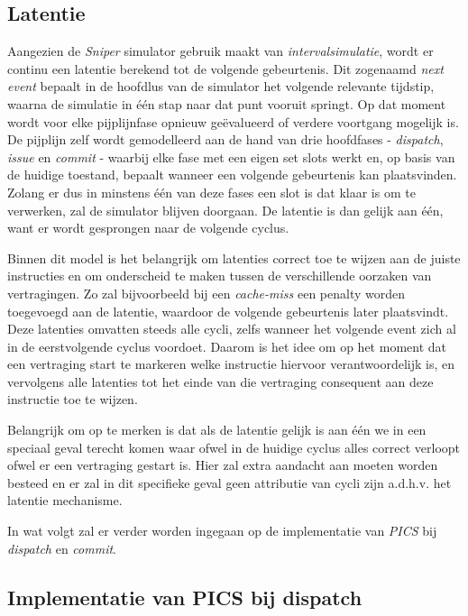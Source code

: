 \documentclass[12pt,a4paper,faculty=ea,language=nl]{ugent-doc}
\begin{document}
\subsection{Latentie}
\label{subsec:Latentie}
Aangezien de \textit{Sniper} simulator gebruik maakt van \textit{intervalsimulatie}, wordt er continu een latentie berekend tot de volgende gebeurtenis. Dit zogenaamd \textit{next event} bepaalt in de hoofdlus van de simulator het volgende relevante tijdstip, waarna de simulatie in één stap naar dat punt vooruit springt. Op dat moment wordt voor elke pijplijnfase opnieuw geëvalueerd of verdere voortgang mogelijk is. De pijplijn zelf wordt gemodelleerd aan de hand van drie hoofdfases - \textit{dispatch}, \textit{issue} en \textit{commit} - waarbij elke fase met een eigen set slots werkt en, op basis van de huidige toestand, bepaalt wanneer een volgende gebeurtenis kan plaatsvinden. Zolang er dus in minstens één van deze fases een slot is dat klaar is om te verwerken, zal de simulator blijven doorgaan. De latentie is dan gelijk aan één, want er wordt gesprongen naar de volgende cyclus.

Binnen dit model is het belangrijk om latenties correct toe te wijzen aan de juiste instructies en om onderscheid te maken tussen de verschillende oorzaken van vertragingen. Zo zal bijvoorbeeld bij een \textit{cache-miss} een penalty worden toegevoegd aan de latentie, waardoor de volgende gebeurtenis later plaatsvindt. Deze latenties omvatten steeds alle cycli, zelfs wanneer het volgende event zich al in de eerstvolgende cyclus voordoet. Daarom is het idee om op het moment dat een vertraging start te markeren welke instructie hiervoor verantwoordelijk is, en vervolgens alle latenties tot het einde van die vertraging consequent aan deze instructie toe te wijzen.

Belangrijk om op te merken is dat als de latentie gelijk is aan één we in een speciaal geval terecht komen waar ofwel in de huidige cyclus alles correct verloopt ofwel er een vertraging gestart is. Hier zal extra aandacht aan moeten worden besteed en er zal in dit specifieke geval geen attributie van cycli zijn a.d.h.v. het latentie mechanisme.

In wat volgt zal er verder worden ingegaan op de implementatie van \textit{PICS} bij \textit{dispatch} en \textit{commit}.
\subsection{Implementatie van PICS bij dispatch}
\label{subsection:PICS bij dispatch}
\end{document}
